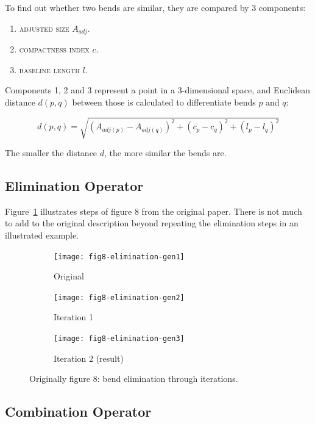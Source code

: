 \documentclass[a4paper]{article}
\begin{document}
To find out whether two bends are similar, they are compared by 3 components:

\begin{enumerate}
  \item \textsc{adjusted size} $A_{adj}$.
  \item \textsc{compactness index} $c$.
  \item \textsc{baseline length} $l$.
\end{enumerate}

Components 1, 2 and 3 represent a point in a 3-dimensional space, and Euclidean
distance $d(p,q)$ between those is calculated to differentiate bends $p$ and
$q$:

\[
  d(p,q) = \sqrt{(A_{adj(p)}-A_{adj(q)})^2 +
                   (c_p-c_q)^2 +
                   (l_p-l_q)^2}
\]

The smaller the distance $d$, the more similar the bends are.

\subsection{Elimination Operator}

Figure~\ref{fig:elimination-through-iterations} illustrates steps of figure 8
from the original paper. There is not much to add to the original description
beyond repeating the elimination steps in an illustrated example.

\begin{figure}[ht]
    \centering
    \begin{subfigure}[b]{.7\textwidth}
        \texttt{[image: fig8-elimination-gen1]}
        \caption{Original}
    \end{subfigure}
    \begin{subfigure}[b]{.7\textwidth}
        \texttt{[image: fig8-elimination-gen2]}
        \caption{Iteration 1}
    \end{subfigure}
    \begin{subfigure}[b]{.7\textwidth}
        \texttt{[image: fig8-elimination-gen3]}
        \caption{Iteration 2 (result)}
    \end{subfigure}
    \caption{Originally figure 8: bend elimination through iterations.}
    \label{fig:elimination-through-iterations}
\end{figure}

\subsection{Combination Operator}
\end{document}
